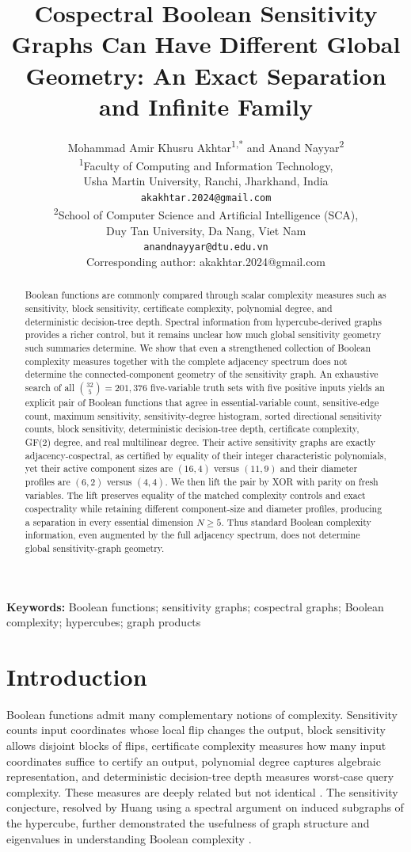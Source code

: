 \documentclass[twoside,12pt,letterpaper]{article}
\title{Cospectral Boolean Sensitivity Graphs Can Have Different Global Geometry: An Exact Separation and Infinite Family}
\author{
	Mohammad Amir Khusru Akhtar\textsuperscript{1,*}
	and Anand Nayyar\textsuperscript{2}\\[6pt]
	\small \textsuperscript{1}Faculty of Computing and Information Technology,\\
	\small Usha Martin University, Ranchi, Jharkhand, India\\
	\small \texttt{akakhtar.2024@gmail.com}\\[8pt]
	\small \textsuperscript{2}School of Computer Science and Artificial Intelligence (SCA),\\
	\small Duy Tan University, Da Nang, Viet Nam\\
	\small \texttt{anandnayyar@dtu.edu.vn}\\[6pt]
	\small *Corresponding author: akakhtar.2024@gmail.com
}
\date{}
\theoremstyle{definition}
\begin{document}
\thispagestyle{empty}

\begin{abstract}
Boolean functions are commonly compared through scalar complexity measures such as sensitivity, block sensitivity, certificate complexity, polynomial degree, and deterministic decision-tree depth. Spectral information from hypercube-derived graphs provides a richer control, but it remains unclear how much global sensitivity geometry such summaries determine. We show that even a strengthened collection of Boolean complexity measures together with the complete adjacency spectrum does not determine the connected-component geometry of the sensitivity graph. An exhaustive search of all $\binom{32}{5}=201{,}376$ five-variable truth sets with five positive inputs yields an explicit pair of Boolean functions that agree in essential-variable count, sensitive-edge count, maximum sensitivity, sensitivity-degree histogram, sorted directional sensitivity counts, block sensitivity, deterministic decision-tree depth, certificate complexity, GF(2) degree, and real multilinear degree. Their active sensitivity graphs are exactly adjacency-cospectral, as certified by equality of their integer characteristic polynomials, yet their active component sizes are $(16,4)$ versus $(11,9)$ and their diameter profiles are $(6,2)$ versus $(4,4)$. We then lift the pair by XOR with parity on fresh variables. The lift preserves equality of the matched complexity controls and exact cospectrality while retaining different component-size and diameter profiles, producing a separation in every essential dimension $N\ge 5$. Thus standard Boolean complexity information, even augmented by the full adjacency spectrum, does not determine global sensitivity-graph geometry.
\end{abstract}

\noindent\textbf{Keywords:} Boolean functions; sensitivity graphs; cospectral graphs; Boolean complexity; hypercubes; graph products

\section{Introduction}
Boolean functions admit many complementary notions of complexity. Sensitivity counts input coordinates whose local flip changes the output, block sensitivity allows disjoint blocks of flips, certificate complexity measures how many input coordinates suffice to certify an output, polynomial degree captures algebraic representation, and deterministic decision-tree depth measures worst-case query complexity. These measures are deeply related but not identical \parencite{nisan1991,nisan1994,buhrman2002,odonnell2014}. The sensitivity conjecture, resolved by Huang using a spectral argument on induced subgraphs of the hypercube, further demonstrated the usefulness of graph structure and eigenvalues in understanding Boolean complexity \parencite{huang2019}.
\end{document}
